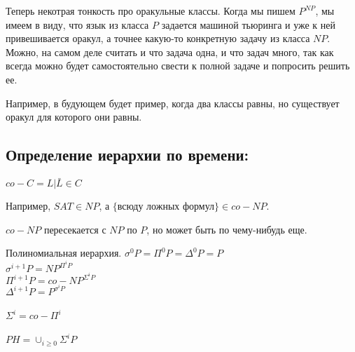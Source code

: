 Теперь некотрая тонкость про оракульные классы. Когда мы пишем $P^{NP}$, мы имеем в виду, что язык из класса 
$P$ задается машиной тьюринга и уже к ней привешивается оракул, а точнее какую-то конкретную задачу из класса $NP$.
Можно, на самом деле считать и что задача одна, и что задач много, так как всегда можно будет самостоятельно свести
к полной задаче и попросить решить ее. 

Например, в будующем будет пример, когда два классы равны, но существует оракул для которого они равны. 

\subsection{Определение иерархии по времени:} 
\begin{Def}
	$co-C = {L|\bar{L} \in C}$
\end{Def}

\begin{exmp}
	Например, $SAT \in NP$, а $\{$всюду ложных формул$\} \in co-NP$.\\
\end{exmp}

\begin{Rem}
	$co-NP$ пересекается с $NP$ по $P$, но может быть по чему-нибудь еще. 
\end{Rem}

\begin{Def}
	Полиномиальная иерархия. 
	$\sigma^0P = \Pi^0P = \Delta^0P = P$\\
	$\sigma^{i + 1}P = NP^{\Pi^iP}$\\
	$\Pi^{i + 1}P = co-NP^{\Sigma^iP}$\\
	$\Delta^{i + 1}P = P^{\sigma^iP}$\\
	\\
	$\Sigma^{i} = co-\Pi^{i}$\\
	\\
	$PH = \cup_{i \ge 0}\Sigma^{i}P$ \\
\end{Def}


